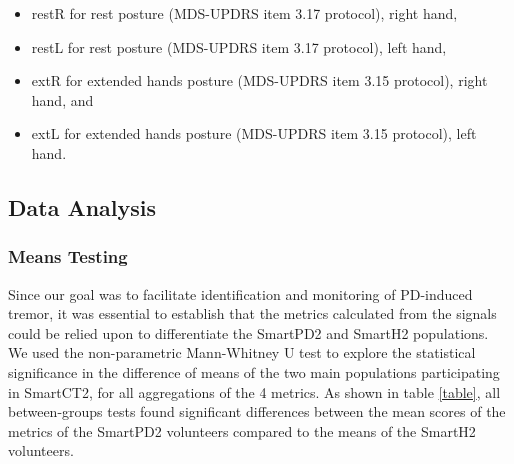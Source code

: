 \begin{itemize}
\item restR for rest posture (\gls{MDS}-\gls{UPDRS} item 3.17 protocol), right hand,
\item restL for rest posture (\gls{MDS}-\gls{UPDRS} item 3.17 protocol), left hand,
\item extR for extended hands posture (\gls{MDS}-\gls{UPDRS} item 3.15 protocol), right hand, and
\item extL for extended hands posture (\gls{MDS}-\gls{UPDRS} item 3.15 protocol), left hand. 
\end{itemize}

\subsection{Data Analysis}
\label{subsec:SmartCT2Analysis}
\subsubsection{Means Testing}
\label{subsubsec:SmartCT2MeansTesting}
Since our goal was to facilitate identification and monitoring of \gls{PD}-induced tremor, it was essential to establish that the metrics calculated from the signals could be relied upon to differentiate the \gls{SmartPD2} and \gls{SmartH2} populations. We used the non-parametric Mann-Whitney U test to explore the statistical significance in the difference of means of the two main populations participating in \gls{SmartCT2}, for all aggregations of the 4 metrics. As shown in table \ref{table}, all between-groups tests found significant differences between the mean scores of the metrics of the \gls{SmartPD2} volunteers compared to the means of the \gls{SmartH2} volunteers. 

